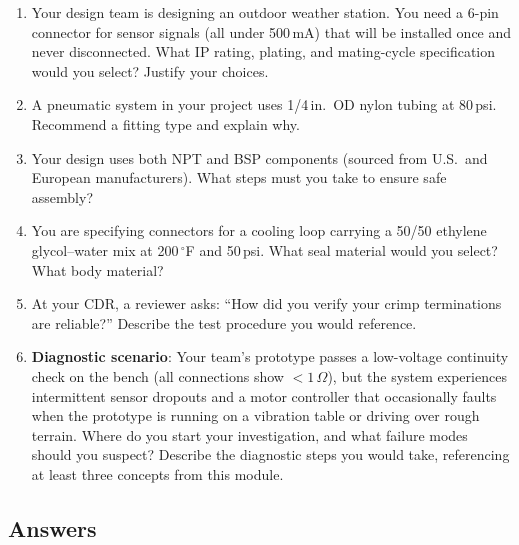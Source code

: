 \documentclass[11pt,letterpaper,twoside,openany]{book}
\begin{document}
\begin{enumerate}[resume,leftmargin=1.5em]
  \item Your design team is designing an outdoor weather station. You need a 6-pin connector for sensor signals (all under 500\,mA) that will be installed once and never disconnected. What IP rating, plating, and mating-cycle specification would you select? Justify your choices.

  \item A pneumatic system in your project uses 1/4\,in.\ OD nylon tubing at 80\,psi. Recommend a fitting type and explain why.

  \item Your design uses both NPT and BSP components (sourced from U.S.\ and European manufacturers). What steps must you take to ensure safe assembly?

  \item You are specifying connectors for a cooling loop carrying a 50/50 ethylene glycol--water mix at 200\,$^{\circ}$F and 50\,psi. What seal material would you select? What body material?

  \item At your CDR, a reviewer asks: ``How did you verify your crimp terminations are reliable?'' Describe the test procedure you would reference.

  \item \textbf{Diagnostic scenario}: Your team's prototype passes a low-voltage continuity check on the bench (all connections show $<1\,\Omega$), but the system experiences intermittent sensor dropouts and a motor controller that occasionally faults when the prototype is running on a vibration table or driving over rough terrain. Where do you start your investigation, and what failure modes should you suspect? Describe the diagnostic steps you would take, referencing at least three concepts from this module.
\end{enumerate}


\newpage
\subsection{Answers}
\end{document}
